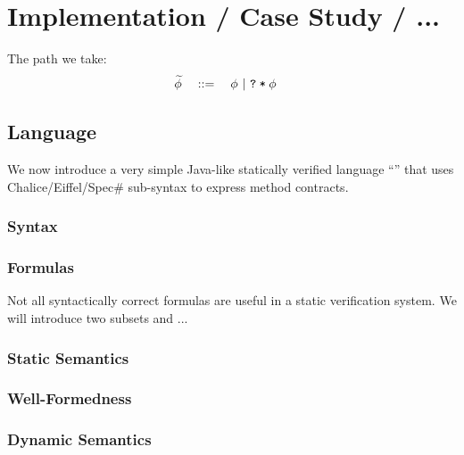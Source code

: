 \chapter{Implementation / Case Study / ...}
The path we take:
\begin{align*}
&\widetilde{\phi} \quad ::= \quad \phi ~|~ \texttt{\texttt{?}\:*\:$\phi$}
\end{align*}

\section{Language}
We now introduce a very simple Java-like statically verified language “\svl” that uses Chalice/Eiffel/Spec\# %
sub-syntax to express method contracts.


\subsection{Syntax}
\label{sec:syntax}


\subsection{Formulas}
Not all syntactically correct formulas are useful in a static verification system.
We will introduce two subsets \setFormulaA and \setFormulaB ...


\subsection{Static Semantics}%
\label{sec:static-semantics}


\subsection{Well-Formedness}
\label{sec:well-formedness}


\subsection{Dynamic Semantics}
\label{ssec:dynamic-semantics}


